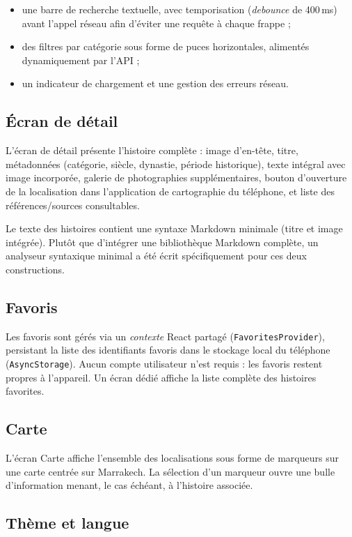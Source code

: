 \documentclass[11pt,a4paper]{article}
\begin{document}
\begin{itemize}[nosep]
    \item une barre de recherche textuelle, avec temporisation (\emph{debounce} de 400\,ms) avant l'appel réseau afin d'éviter une requête à chaque frappe ;
    \item des filtres par catégorie sous forme de puces horizontales, alimentés dynamiquement par l'API ;
    \item un indicateur de chargement et une gestion des erreurs réseau.
\end{itemize}

\subsection{Écran de détail}

L'écran de détail présente l'histoire complète : image d'en-tête, titre, métadonnées (catégorie, siècle, dynastie, période historique), texte intégral avec image incorporée, galerie de photographies supplémentaires, bouton d'ouverture de la localisation dans l'application de cartographie du téléphone, et liste des références/sources consultables.

Le texte des histoires contient une syntaxe Markdown minimale (titre et image intégrée). Plutôt que d'intégrer une bibliothèque Markdown complète, un analyseur syntaxique minimal a été écrit spécifiquement pour ces deux constructions.

\subsection{Favoris}

Les favoris sont gérés via un \emph{contexte} React partagé (\texttt{FavoritesProvider}), persistant la liste des identifiants favoris dans le stockage local du téléphone (\texttt{AsyncStorage}). Aucun compte utilisateur n'est requis : les favoris restent propres à l'appareil. Un écran dédié affiche la liste complète des histoires favorites.

\subsection{Carte}

L'écran Carte affiche l'ensemble des localisations sous forme de marqueurs sur une carte centrée sur Marrakech. La sélection d'un marqueur ouvre une bulle d'information menant, le cas échéant, à l'histoire associée.

\subsection{Thème et langue}
\end{document}
